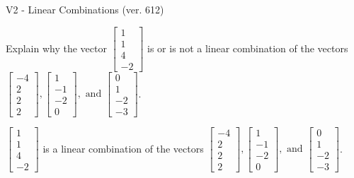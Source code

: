 \begin{exercise}
  \begin{exerciseTitle}V2 - Linear Combinations (ver. 612)\end{exerciseTitle}
  \begin{exerciseStatement}
    Explain why the vector \(\left[\begin{array}{c}
1 \\
1 \\
4 \\
-2
\end{array}\right]\)  is or is not a linear 
	combination of the vectors \(\left[\begin{array}{c}
-4 \\
2 \\
2 \\
2
\end{array}\right] , \left[\begin{array}{c}
1 \\
-1 \\
-2 \\
0
\end{array}\right] , \text{ and } \left[\begin{array}{c}
0 \\
1 \\
-2 \\
-3
\end{array}\right]\).
	


  \end{exerciseStatement}
  \begin{exerciseAnswer}
   \(\left[\begin{array}{c}
1 \\
1 \\
4 \\
-2
\end{array}\right]\) 
  	 is  
	a linear combination of the vectors \(\left[\begin{array}{c}
-4 \\
2 \\
2 \\
2
\end{array}\right] , \left[\begin{array}{c}
1 \\
-1 \\
-2 \\
0
\end{array}\right] , \text{ and } \left[\begin{array}{c}
0 \\
1 \\
-2 \\
-3
\end{array}\right]\).

	
  


  \end{exerciseAnswer}
\end{exercise}